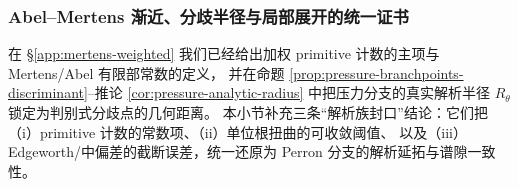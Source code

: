 
\subsubsection{Abel--Mertens 渐近、分歧半径与局部展开的统一证书}\label{app:sync-kernel-weighted-abel-mertens-analytic-radius-edgeworth}
在 \S\ref{app:mertens-weighted} 我们已经给出加权 primitive 计数的主项与 Mertens/Abel 有限部常数的定义，
并在命题 \ref{prop:pressure-branchpoints-discriminant}--推论 \ref{cor:pressure-analytic-radius} 中把压力分支的真实解析半径 \(R_\theta\) 锁定为判别式分歧点的几何距离。
本小节补充三条“解析族封口”结论：它们把（i）primitive 计数的常数项、（ii）单位根扭曲的可收敛阈值、
以及（iii）Edgeworth/中偏差的截断误差，统一还原为 Perron 分支的解析延拓与谱隙一致性。

